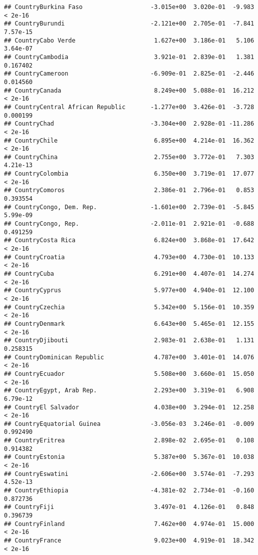 \documentclass[
]{article}
\begin{document}
\begin{verbatim}
## CountryBurkina Faso                   -3.015e+00  3.020e-01  -9.983  < 2e-16
## CountryBurundi                        -2.121e+00  2.705e-01  -7.841 7.57e-15
## CountryCabo Verde                      1.627e+00  3.186e-01   5.106 3.64e-07
## CountryCambodia                        3.921e-01  2.839e-01   1.381 0.167402
## CountryCameroon                       -6.909e-01  2.825e-01  -2.446 0.014560
## CountryCanada                          8.249e+00  5.088e-01  16.212  < 2e-16
## CountryCentral African Republic       -1.277e+00  3.426e-01  -3.728 0.000199
## CountryChad                           -3.304e+00  2.928e-01 -11.286  < 2e-16
## CountryChile                           6.895e+00  4.214e-01  16.362  < 2e-16
## CountryChina                           2.755e+00  3.772e-01   7.303 4.21e-13
## CountryColombia                        6.350e+00  3.719e-01  17.077  < 2e-16
## CountryComoros                         2.386e-01  2.796e-01   0.853 0.393554
## CountryCongo, Dem. Rep.               -1.601e+00  2.739e-01  -5.845 5.99e-09
## CountryCongo, Rep.                    -2.011e-01  2.921e-01  -0.688 0.491259
## CountryCosta Rica                      6.824e+00  3.868e-01  17.642  < 2e-16
## CountryCroatia                         4.793e+00  4.730e-01  10.133  < 2e-16
## CountryCuba                            6.291e+00  4.407e-01  14.274  < 2e-16
## CountryCyprus                          5.977e+00  4.940e-01  12.100  < 2e-16
## CountryCzechia                         5.342e+00  5.156e-01  10.359  < 2e-16
## CountryDenmark                         6.643e+00  5.465e-01  12.155  < 2e-16
## CountryDjibouti                        2.983e-01  2.638e-01   1.131 0.258315
## CountryDominican Republic              4.787e+00  3.401e-01  14.076  < 2e-16
## CountryEcuador                         5.508e+00  3.660e-01  15.050  < 2e-16
## CountryEgypt, Arab Rep.                2.293e+00  3.319e-01   6.908 6.79e-12
## CountryEl Salvador                     4.038e+00  3.294e-01  12.258  < 2e-16
## CountryEquatorial Guinea              -3.056e-03  3.246e-01  -0.009 0.992490
## CountryEritrea                         2.898e-02  2.695e-01   0.108 0.914382
## CountryEstonia                         5.387e+00  5.367e-01  10.038  < 2e-16
## CountryEswatini                       -2.606e+00  3.574e-01  -7.293 4.52e-13
## CountryEthiopia                       -4.381e-02  2.734e-01  -0.160 0.872736
## CountryFiji                            3.497e-01  4.126e-01   0.848 0.396739
## CountryFinland                         7.462e+00  4.974e-01  15.000  < 2e-16
## CountryFrance                          9.023e+00  4.919e-01  18.342  < 2e-16

\end{verbatim}
\end{document}
